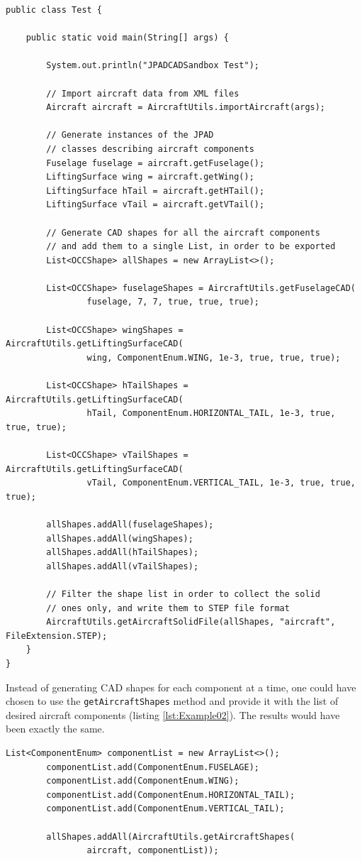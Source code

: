 \begin{lstlisting}[caption={Usage of \lstinline!AircraftUtils! methods}, captionpos=b, tabsize=2, label={lst:Example01}]
public class Test {

	public static void main(String[] args) {

		System.out.println("JPADCADSandbox Test");
		
		// Import aircraft data from XML files
		Aircraft aircraft = AircraftUtils.importAircraft(args);	
		
		// Generate instances of the JPAD 
		// classes describing aircraft components
		Fuselage fuselage = aircraft.getFuselage();	
		LiftingSurface wing = aircraft.getWing();		
		LiftingSurface hTail = aircraft.getHTail();
		LiftingSurface vTail = aircraft.getVTail();
		
		// Generate CAD shapes for all the aircraft components
		// and add them to a single List, in order to be exported
		List<OCCShape> allShapes = new ArrayList<>();
		
		List<OCCShape> fuselageShapes = AircraftUtils.getFuselageCAD(
				fuselage, 7, 7, true, true, true);
				
		List<OCCShape> wingShapes = AircraftUtils.getLiftingSurfaceCAD(
				wing, ComponentEnum.WING, 1e-3, true, true, true);
				
		List<OCCShape> hTailShapes = AircraftUtils.getLiftingSurfaceCAD(
				hTail, ComponentEnum.HORIZONTAL_TAIL, 1e-3, true, true, true);
				
		List<OCCShape> vTailShapes = AircraftUtils.getLiftingSurfaceCAD(
				vTail, ComponentEnum.VERTICAL_TAIL, 1e-3, true, true, true);	
				
		allShapes.addAll(fuselageShapes);
		allShapes.addAll(wingShapes);
		allShapes.addAll(hTailShapes);
		allShapes.addAll(vTailShapes);
		
		// Filter the shape list in order to collect the solid
		// ones only, and write them to STEP file format
		AircraftUtils.getAircraftSolidFile(allShapes, "aircraft", FileExtension.STEP);
	}
}
\end{lstlisting}

\bigskip
\noindent
Instead of generating \gls{CAD} shapes for each component at a time, one could have chosen to use the \lstinline[language=Java]!getAircraftShapes! method and provide it with the list of desired aircraft components (listing \ref{lst:Example02}). The results would have been exactly the same.
%
\bigskip
\begin{lstlisting}[caption={Usage of \lstinline!getAircraftShapes! method}, captionpos=b, tabsize=2, label={lst:Example02}]
		List<ComponentEnum> componentList = new ArrayList<>();
		componentList.add(ComponentEnum.FUSELAGE);
		componentList.add(ComponentEnum.WING);
		componentList.add(ComponentEnum.HORIZONTAL_TAIL);
		componentList.add(ComponentEnum.VERTICAL_TAIL);
		
		allShapes.addAll(AircraftUtils.getAircraftShapes(
				aircraft, componentList));
\end{lstlisting}

